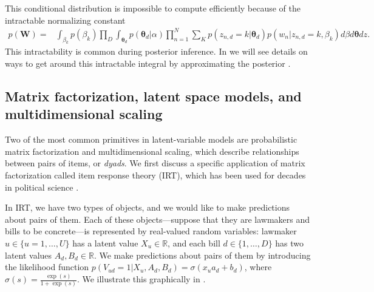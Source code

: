 This conditional distribution is impossible to compute efficiently because of the
intractable normalizing constant
\begin{align} 
  p(\bm W) = & 
  \int_{\beta_k} p(\beta_k)
  \prod_D \int_{\bm \theta_d} p(\bm \theta_d | \alpha) 
  \prod_{n=1}^N \sum_K p(z_{n,d}=k | \bm \theta_d) p(w_n | z_{n,d}=k, \beta_k) d\beta d\bm \theta dz.
\end{align}
This intractability is common during posterior inference.  In
 we will see details on ways to get around
this intractable integral by approximating the posterior \cite{blei:2003}.



\subsection{Matrix factorization, latent space models, and
  multidimensional scaling}

Two of the most common primitives in latent-variable models are
probabilistic matrix factorization \citep{salakhutdinov:2008a} and
multidimensional scaling, which describe relationships between pairs
of items, or \emph{dyads}. We first discuss a specific application of
matrix factorization called item response theory (IRT), which has been
used for decades in political science
\citep{clinton:2004,martin:2002,poole:1991,enelow:1984,albert:1992}.

In IRT, we have two types of objects, and we would like to make
predictions about pairs of them.  Each of these objects---suppose that
they are lawmakers and bills to be concrete---is represented by
real-valued random variables: lawmaker $u \in \{ u=1, \ldots, U \}$
has a latent value $X_u \in \mathbb{R}$, and each bill $d \in \{ 1,
\ldots, D \}$ has two latent values $A_d,B_d \in \mathbb{R}$.  We make
predictions about pairs of them by introducing the likelihood function
$p(V_{ud}=1 | X_u, A_d, B_d) = \sigma( x_u a_d + b_d )$, where
$\sigma(s) = \frac{\exp(s)}{ 1 + \exp(s) }$.  We illustrate this
graphically in .

